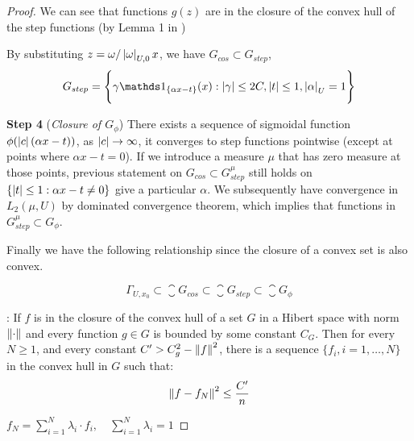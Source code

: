 \begin{proof}
    We can see that functions $g(z)$ are in the closure of the convex hull of
    the step functions (by Lemma 1 in
    \cite{barronUniversalApproximationBounds1993})

    By substituting $z = \omega/\left| \omega \right|_{U, 0} x$, we have $G_{cos} \subset
        G_{step}$,
    \begin{equation}
        G_{step} = \Bigg\{
            \gamma\indicator{\{\alpha x-t\}}(x):
            \abs{\gamma} \leq 2C,
            \abs{t} \leq 1,
            \abs{\alpha}_{U} = 1
        \Bigg\}
    \end{equation}

    \textbf{Step 4} (\textit{Closure of $G_{\phi}$}) There exists a sequence of
    sigmoidal function $\phi(\left| c \right|(\alpha x - t))$, as $\left| c \right| \to \infty$,
    it converges to step functions pointwise (except at points where $\alpha x -
        t = 0$). If we introduce a measure $\mu$ that has zero measure at those
    points, previous statement on $G_{cos} \subset G^{\mu}_{step}$ still holds
    on $\{\left| t \right| \leq 1: \alpha x - t \not=0\}$ give a particular $\alpha$. We
    subsequently have convergence in $L_2(\mu, U)$ by dominated convergence
    theorem, which implies that functions in $G^{\mu}_{step} \subset G_{\phi}$.

    Finally we have the following relationship since the closure of a convex set
    is also convex.

    \begin{equation*}
        \Gamma_{U, x_0} \subset \closure{G_{cos}} \subset \closure{G_{step}} \subset \closure{G_{\phi}}
    \end{equation*}

    \cite[\textit{Lemma~1}]{barronUniversalApproximationBounds1993}: If $f$ is
    in the closure of the convex hull of a set $G$ in a Hibert space with norm
    $\left\| \cdot \right\|$ and every function $g \in G$ is bounded by some constant
    $C_G$. Then for every $N \geq 1$, and every constant $C' > C_g^2 -
        \left\| f \right\|^2$, there is a sequence $\{f_i, i = 1, \dots, N\}$ in the convex
    hull in $G$ such that:
    \begin{equation}
        \left\| f - f_N \right\|^2 \leq \frac{C'}{n}
    \end{equation}

    $f_N = \sum_{i=1}^N \lambda_i \cdot f_i, \quad \sum_{i=1}^N \lambda_i = 1$



\end{proof}

